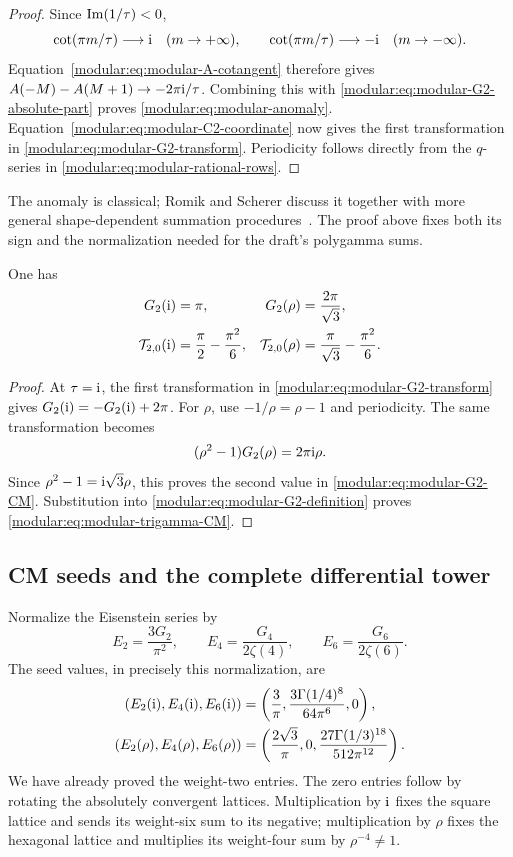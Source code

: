\begin{proof}
Since \(\operatorname{Im}(1/\tau)<0\),
\[
\cot(\pi m/\tau)\longrightarrow\mathrm{i}\quad(m\to+\infty),
\qquad
\cot(\pi m/\tau)\longrightarrow-\mathrm{i}\quad(m\to-\infty).
\]
Equation~\eqref{modular:eq:modular-A-cotangent} therefore gives
\(A(-M)-A(M+1)\to-2\pi\mathrm{i}/\tau\). Combining this with
\eqref{modular:eq:modular-G2-absolute-part} proves
\eqref{modular:eq:modular-anomaly}. Equation~\eqref{modular:eq:modular-C2-coordinate}
now gives the first transformation in
\eqref{modular:eq:modular-G2-transform}. Periodicity follows directly from
the \(q\)-series in \eqref{modular:eq:modular-rational-rows}.
\end{proof}

The anomaly is classical; Romik and Scherer discuss it together with
more general shape-dependent summation procedures~\cite{modular:RomikScherer}.
The proof above fixes both its sign and the normalization needed for
the draft's polygamma sums.

\begin{corollary}
\label{modular:cor:modular-weight-two-CM}
One has
\begin{align}
G_2(\mathrm{i})&=\pi,&G_2(\rho)&=\frac{2\pi}{\sqrt3},
\label{modular:eq:modular-G2-CM}\\
\mathcal T_{2,0}(\mathrm{i})&=\frac\pi2-\frac{\pi^2}{6},&
\mathcal T_{2,0}(\rho)&=\frac\pi{\sqrt3}-\frac{\pi^2}{6}.
\label{modular:eq:modular-trigamma-CM}
\end{align}
\end{corollary}
\begin{proof}
At \(\tau=\mathrm{i}\), the first transformation in
\eqref{modular:eq:modular-G2-transform} gives
\(G_2(\mathrm{i})=-G_2(\mathrm{i})+2\pi\).
For \(\rho\), use \(-1/\rho=\rho-1\) and periodicity. The same
transformation becomes
\[
(\rho^2-1)G_2(\rho)=2\pi\mathrm{i}\rho.
\]
Since \(\rho^2-1=\mathrm{i}\sqrt3\rho\), this proves the second value in
\eqref{modular:eq:modular-G2-CM}. Substitution into
\eqref{modular:eq:modular-G2-definition} proves
\eqref{modular:eq:modular-trigamma-CM}.
\end{proof}

\subsection{CM seeds and the complete differential tower}

Normalize the Eisenstein series by
\[
E_2=\frac{3G_2}{\pi^2},\qquad
E_4=\frac{G_4}{2\zeta(4)},\qquad
E_6=\frac{G_6}{2\zeta(6)}.
\]
The seed values, in precisely this normalization, are
\begin{align}
(E_2(\mathrm{i}),E_4(\mathrm{i}),E_6(\mathrm{i}))
&=\left(\frac3\pi,
 \frac{3\Gamma(1/4)^8}{64\pi^6},0\right),
\label{modular:eq:modular-square-seeds}\\
(E_2(\rho),E_4(\rho),E_6(\rho))
&=\left(\frac{2\sqrt3}\pi,0,
 \frac{27\Gamma(1/3)^{18}}{512\pi^{12}}\right).
\label{modular:eq:modular-hex-seeds}
\end{align}
We have already proved the weight-two entries. The zero entries follow
by rotating the absolutely convergent lattices. Multiplication by
\(\mathrm{i}\) fixes the square lattice and sends its weight-six sum to its
negative; multiplication by \(\rho\) fixes the hexagonal lattice and
multiplies its weight-four sum by \(\rho^{-4}\ne1\).

